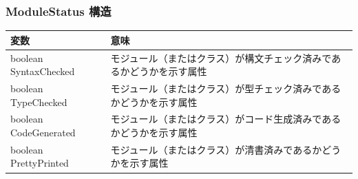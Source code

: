 \documentclass[\pformat,12pt]{jarticle}
\newcommand{\pbs}[1]{\let\temp=\\#1\let\\=\temp}
\begin{document}
\subsubsection{ModuleStatus 構造}\label{api:ModuleStatusStructure}
\mbox{}
\begin{longtable}{|>{\pbs\raggedright\ttfamily}p{6.6cm}%
                  |>{\pbs\raggedright}p{6.6cm}|} \hline
  \textrm{\bfseries 変数} &  \textrm{\bfseries 意味} \\ \hline
boolean SyntaxChecked
  & モジュール（またはクラス）が構文チェック済みであるかどうかを示す属性
\\ \hline
boolean TypeChecked
  & モジュール（またはクラス）が型チェック済みであるかどうかを示す属性
\\ \hline
boolean CodeGenerated
  & モジュール（またはクラス）がコード生成済みであるかどうかを示す属性
\\ \hline
boolean PrettyPrinted
  & モジュール（またはクラス）が清書済みであるかどうかを示す属性
\\ \hline
\end{longtable}
\end{document}
